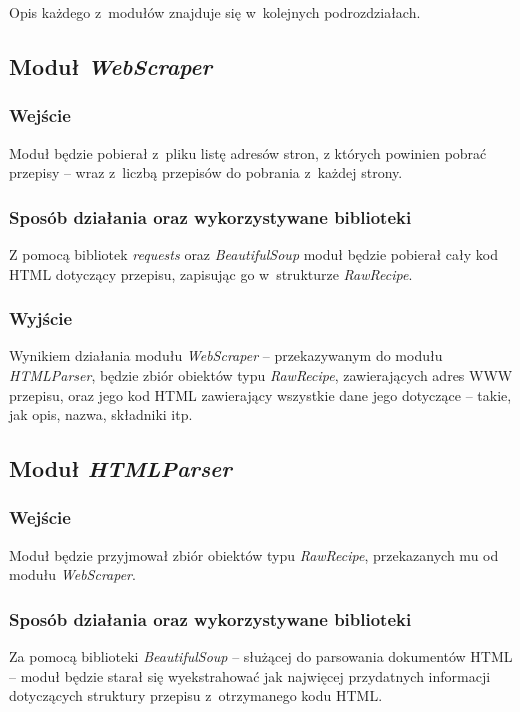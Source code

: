 \documentclass[11pt,a4paper]{article}
\begin{document}
Opis każdego z~modułów znajduje się w~kolejnych podrozdziałach.

\subsection{Moduł \textit{WebScraper}}
\subsubsection{Wejście}
Moduł będzie pobierał z~pliku listę adresów stron, z których powinien pobrać przepisy -- wraz z~liczbą przepisów do pobrania z~każdej strony.
\subsubsection{Sposób działania oraz wykorzystywane biblioteki}
Z pomocą bibliotek \textit{requests} oraz \textit{BeautifulSoup} moduł będzie pobierał cały kod HTML dotyczący przepisu, zapisując go w~strukturze \textit{RawRecipe}.
\subsubsection{Wyjście}
Wynikiem działania modułu \textit{WebScraper} -- przekazywanym do modułu \textit{HTMLParser}, będzie zbiór obiektów typu \textit{RawRecipe}, zawierających adres WWW przepisu, oraz jego kod HTML zawierający wszystkie dane jego dotyczące -- takie, jak opis, nazwa, składniki itp.

\subsection{Moduł \textit{HTMLParser}}
\subsubsection{Wejście}
Moduł będzie przyjmował zbiór obiektów typu \textit{RawRecipe}, przekazanych mu od modułu \textit{WebScraper}.
\subsubsection{Sposób działania oraz wykorzystywane biblioteki}
Za pomocą biblioteki \textit{BeautifulSoup} -- służącej do parsowania dokumentów HTML -- moduł będzie starał się wyekstrahować jak najwięcej przydatnych informacji dotyczących struktury przepisu z~otrzymanego kodu HTML.
\end{document}
